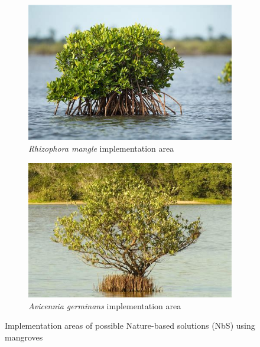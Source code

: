 \begin{figure}[H]
    \centering
    \begin{subfigure}{0.48\textwidth}
        \centering
        \includegraphics[width=\linewidth]{figures/ch8/mangrove1.jpeg}
        \caption{\textit{Rhizophora mangle} implementation area}
        \label{fig:Rhizophora mangle}
    \end{subfigure}
    \hfill
    \begin{subfigure}{0.48\textwidth}
        \centering
        \includegraphics[width=\linewidth]{figures/ch8/mangrove2.jpeg}
        \caption{\textit{Avicennia germinans} implementation area}
        \label{fig:Avicennia germinans}
    \end{subfigure}
    \caption{Implementation areas of possible Nature-based solutions (NbS) using mangroves}
    \label{fig:mangrove_nbs}
\end{figure}


